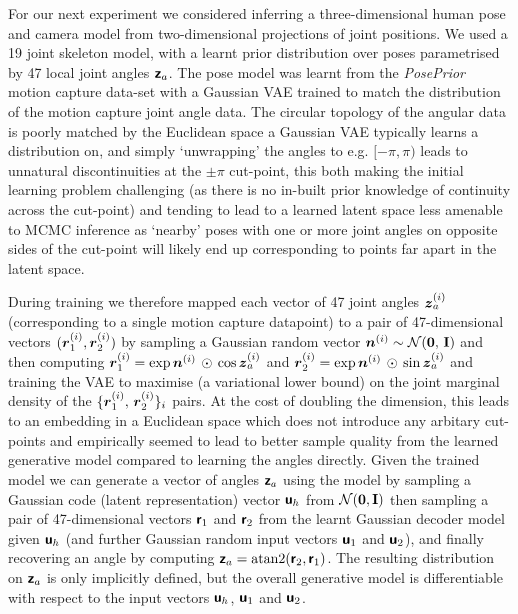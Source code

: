 \begin{figure}[!t]
\label{fig:pose-inference}
\end{figure}

For our next experiment we considered inferring a three-dimensional human pose and camera model from two-dimensional projections of joint positions. We used a 19 joint skeleton model, with a learnt prior distribution over poses parametrised by 47 local joint angles $\boldsymbol{\mathsf{z}}_a$. The pose model was learnt from the \emph{PosePrior} motion capture data-set \citep{akhter2015pose} with a Gaussian \ac{VAE} \citep{kingma2013auto} trained to match the distribution of the motion capture joint angle data. The circular topology of the angular data is poorly matched by the Euclidean space a Gaussian \ac{VAE} typically learns a distribution on, and simply `unwrapping' the angles to e.g. $[-\pi,\pi)$ leads to unnatural discontinuities at the $\pm \pi$ cut-point, this both making the initial learning problem challenging (as there is no in-built prior knowledge of continuity across the cut-point) and tending to lead to a learned latent space less amenable to \ac{MCMC} inference as `nearby' poses with one or more joint angles on opposite sides of the cut-point will likely end up corresponding to points far apart in the latent space.

During training we therefore mapped each vector of 47 joint angles $\boldsymbol{z}_a^{(i)}$ (corresponding to a single motion capture datapoint) to a pair of 47-dimensional vectors $(\boldsymbol{r}_1^{(i)},\boldsymbol{r}_2^{(i)})$ by sampling a Gaussian random vector $\vct{n}^{(i)} \sim \nrm{\vct{0},\,\idmtx}$ and then computing $\boldsymbol{r}_1^{(i)} = \exp\boldsymbol{n}^{(i)}\,\odot\,\cos\boldsymbol{z}_a^{(i)}$ and $ \boldsymbol{r}^{(i)}_2 = \exp\boldsymbol{n}^{(i)}\,\odot\,\sin\boldsymbol{z}^{(i)}_a$ and training the \ac{VAE} to maximise (a variational lower bound) on the joint marginal density of the $\lbrace \boldsymbol{r}^{(i)}_1,\,\boldsymbol{r}^{(i)}_2\rbrace_i$ pairs. At the cost of doubling the dimension, this leads to an embedding in a Euclidean space which does not introduce any arbitary cut-points and empirically seemed to lead to better sample quality from the learned generative model compared to learning the angles directly. Given the trained model we can generate a vector of angles $\boldsymbol{\mathsf{z}}_a$ using the model by sampling a Gaussian code (latent representation) vector $\boldsymbol{\mathsf{u}}_h$ from $\nrm{\vct{0},\idmtx}$ then sampling a pair of 47-dimensional vectors $\boldsymbol{\mathsf{r}}_1$ and $\boldsymbol{\mathsf{r}}_2$ from the learnt Gaussian decoder model given $\boldsymbol{\mathsf{u}}_h$ (and further Gaussian random input vectors $\boldsymbol{\mathsf{u}}_1$ and $\boldsymbol{\mathsf{u}}_2$), and finally recovering an angle by computing $\boldsymbol{\mathsf{z}}_a = \textrm{atan2}(\boldsymbol{\mathsf{r}}_2,\boldsymbol{\mathsf{r}}_1)$. The resulting distribution on $\boldsymbol{\mathsf{z}}_a$ is only implicitly defined, but the overall generative model is differentiable with respect to the input vectors $\boldsymbol{\mathsf{u}}_h$, $\boldsymbol{\mathsf{u}}_1$ and $\boldsymbol{\mathsf{u}}_2$.

